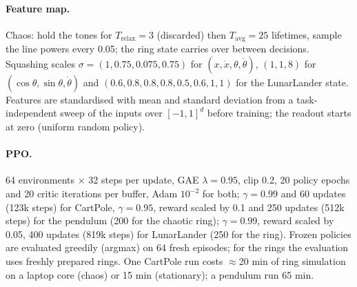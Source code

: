 \documentclass[10pt,a4paper]{article}
\newcommand{\Tavg}{T_{\mathrm{avg}}}
\newcommand{\Trelax}{T_{\mathrm{relax}}}
\begin{document}
\paragraph{Feature map.}  Chaos: hold the tones for $\Trelax=3$ (discarded) then $\Tavg=25$ lifetimes, sample the line
powers every 0.05; the ring state carries over between decisions.  Squashing scales $\sigma=(1,0.75,0.075,0.75)$ for
$(x,\dot x,\theta,\dot\theta)$, $(1,1,8)$ for $(\cos\theta,\sin\theta,\dot\theta)$ and $(0.6,0.8,0.8,0.8,0.5,0.6,1,1)$ for the
LunarLander state.  Features are standardised with mean
and standard deviation from a task-independent sweep of the inputs over $[-1,1]^d$ before training; the readout starts at zero
(uniform random policy).
\paragraph{PPO.}  64 environments $\times$ 32 steps per update, GAE $\lambda=0.95$, clip 0.2, 20 policy epochs and 20 critic
iterations per buffer, Adam $10^{-2}$ for both; $\gamma=0.99$ and 60 updates (123k steps) for CartPole, $\gamma=0.95$,
reward scaled by 0.1 and 250 updates (512k steps) for the pendulum (200 for the chaotic ring); $\gamma=0.99$, reward scaled
by 0.05, 400 updates (819k steps) for LunarLander (250 for the ring).  Frozen policies are evaluated
greedily (argmax) on 64 fresh episodes; for the rings the evaluation uses freshly prepared rings.  One CartPole run costs
$\approx$20 min of ring simulation on a laptop core (chaos) or 15 min (stationary); a pendulum run 65 min.
\end{document}
